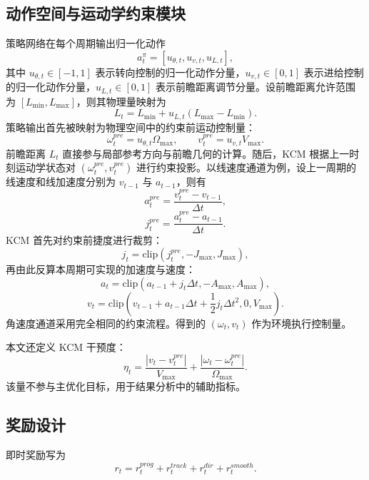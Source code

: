 \documentclass[preprint,12pt]{elsarticle}
\begin{document}
\subsection{动作空间与运动学约束模块}
策略网络在每个周期输出归一化动作
\begin{equation}
 a_t^{\pi}=[u_{\theta,t},u_{v,t},u_{L,t}],
\end{equation}
其中 $u_{\theta,t}\in[-1,1]$ 表示转向控制的归一化动作分量，$u_{v,t}\in[0,1]$ 表示进给控制的归一化动作分量，$u_{L,t}\in[0,1]$ 表示前瞻距离调节分量。设前瞻距离允许范围为 $[L_{\min},L_{\max}]$，则其物理量映射为
\begin{equation}
L_t=L_{\min}+u_{L,t}(L_{\max}-L_{\min}).
\end{equation}
策略输出首先被映射为物理空间中的约束前运动控制量：
\begin{equation}
\omega_t^{pre}=u_{\theta,t}\Omega_{\max},\qquad v_t^{pre}=u_{v,t}V_{\max}.
\end{equation}
前瞻距离 $L_t$ 直接参与局部参考方向与前瞻几何的计算。随后，KCM 根据上一时刻运动学状态对 $(\omega_t^{pre},v_t^{pre})$ 进行约束投影。以线速度通道为例，设上一周期的线速度和线加速度分别为 $v_{t-1}$ 与 $a_{t-1}$，则有
\begin{equation}
 a_t^{pre}=\frac{v_t^{pre}-v_{t-1}}{\Delta t},
\end{equation}
\begin{equation}
 j_t^{pre}=\frac{a_t^{pre}-a_{t-1}}{\Delta t}.
\end{equation}
KCM 首先对约束前捷度进行裁剪：
\begin{equation}
 j_t=\mathrm{clip}(j_t^{pre},-J_{\max},J_{\max}),
\end{equation}
再由此反算本周期可实现的加速度与速度：
\begin{equation}
 a_t=\mathrm{clip}(a_{t-1}+j_t\Delta t,-A_{\max},A_{\max}),
\end{equation}
\begin{equation}
 v_t=\mathrm{clip}\left(v_{t-1}+a_{t-1}\Delta t+\frac{1}{2}j_t\Delta t^2,0,V_{\max}\right).
\end{equation}
角速度通道采用完全相同的约束流程。得到的 $(\omega_t,v_t)$ 作为环境执行控制量。

本文还定义 KCM 干预度：
\begin{equation}
\eta_t=\frac{|v_t-v_t^{pre}|}{V_{\max}}+\frac{|\omega_t-\omega_t^{pre}|}{\Omega_{\max}}.
\end{equation}
该量不参与主优化目标，用于结果分析中的辅助指标。

\subsection{奖励设计}
即时奖励写为
\begin{equation}
 r_t=r_t^{prog}+r_t^{track}+r_t^{dir}+r_t^{smooth}.
\label{eq:reward_total}
\end{equation}
\end{document}
